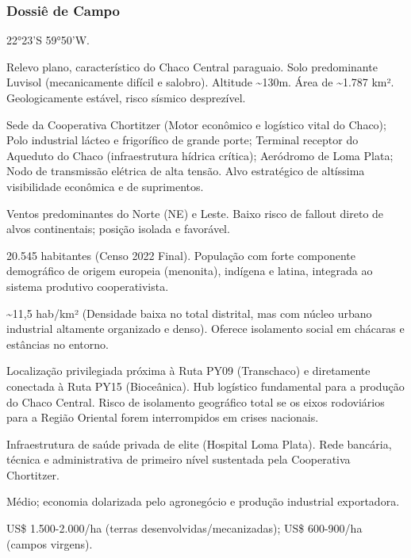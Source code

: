 \subsubsection{Dossiê de Campo}
\begin{description}[style=nextline,leftmargin=0.5cm,font=\bfseries]
\item[Coordenadas]  22°23'S 59°50'W.
\item[Topografia]  Relevo plano, característico do Chaco Central paraguaio. Solo predominante Luvisol (mecanicamente difícil e salobro). Altitude \textasciitilde 130m. Área de \textasciitilde 1.787 km². Geologicamente estável, risco sísmico desprezível.
\item[Alvos Estratégicos]  Sede da Cooperativa Chortitzer (Motor econômico e logístico vital do Chaco); Polo industrial lácteo e frigorífico de grande porte; Terminal receptor do Aqueduto do Chaco (infraestrutura hídrica crítica); Aeródromo de Loma Plata; Nodo de transmissão elétrica de alta tensão. Alvo estratégico de altíssima visibilidade econômica e de suprimentos.
\item[Fallout]  Ventos predominantes do Norte (NE) e Leste. Baixo risco de fallout direto de alvos continentais; posição isolada e favorável.
\item[População]  20.545 habitantes (Censo 2022 Final). População com forte componente demográfico de origem europeia (menonita), indígena e latina, integrada ao sistema produtivo cooperativista.
\item[Densidade]  \textasciitilde 11,5 hab/\allowbreak km² (Densidade baixa no total distrital, mas com núcleo urbano industrial altamente organizado e denso). Oferece isolamento social em chácaras e estâncias no entorno.
\item[Vias de Acesso]  Localização privilegiada próxima à Ruta PY09 (Transchaco) e diretamente conectada à Ruta PY15 (Bioceânica). Hub logístico fundamental para a produção do Chaco Central. Risco de isolamento geográfico total se os eixos rodoviários para a Região Oriental forem interrompidos em crises nacionais.
\item[Serviços]  Infraestrutura de saúde privada de elite (Hospital Loma Plata). Rede bancária, técnica e administrativa de primeiro nível sustentada pela Cooperativa Chortitzer.
\item[Custo de Vida]  Médio; economia dolarizada pelo agronegócio e produção industrial exportadora.
\item[Preço da Terra]  US\$ 1.500-2.000/\allowbreak ha (terras desenvolvidas/\allowbreak mecanizadas); US\$ 600-900/\allowbreak ha (campos virgens).

\end{description}
